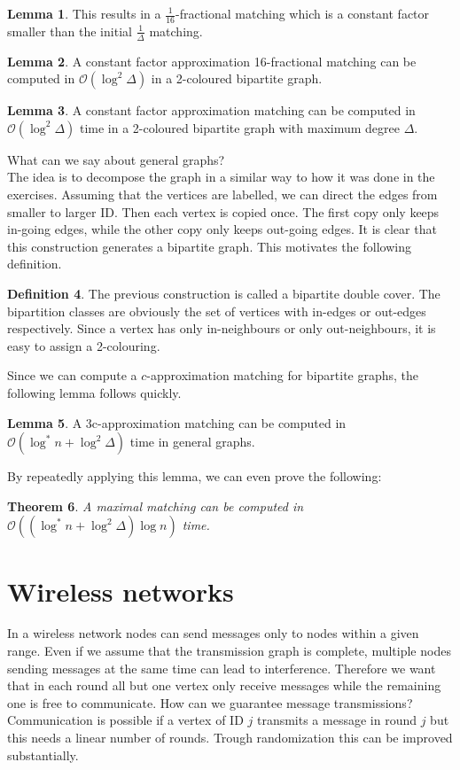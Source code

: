 \documentclass[a4paper, 12pt]{article}
\theoremstyle{plain}
\newtheorem{theorem}{Theorem}[section] %
\theoremstyle{definition}
\newtheorem{definition}[theorem]{Definition} %
\theoremstyle{lemma}
\newtheorem{lemma}[theorem]{Lemma}
\theoremstyle{remark}
\theoremstyle{corollary}
\theoremstyle{example}
\begin{document}
	\begin{lemma}
		This results in a $\frac{1}{16}$-fractional matching which is a constant factor smaller than the initial $\frac{1}{\Delta}$ matching. 
	\end{lemma}
	\begin{lemma}
		A constant factor approximation 16-fractional matching can be computed in $\mathcal{O}(\log^2 \Delta)$ in a 2-coloured bipartite graph.
	\end{lemma}
	\begin{lemma}
		A constant factor approximation matching can be computed in $\mathcal{O}(\log^2 \Delta)$ time in a 2-coloured bipartite graph with maximum degree $\Delta$.
	\end{lemma}
	What can we say about general graphs?\\
	The idea is to decompose the graph in a similar way to how it was done in the exercises. Assuming that the vertices are labelled, we can direct the edges from smaller to larger ID. Then each vertex is copied once. The first copy only keeps in-going edges, while the other copy only keeps out-going edges. It is clear that this construction generates a bipartite graph. This motivates the following definition.
	\begin{definition}
		The previous construction is called a bipartite double cover. The bipartition classes are obviously the set of vertices with in-edges or out-edges respectively. Since a vertex has only in-neighbours or only out-neighbours, it is easy to assign a 2-colouring.
	\end{definition}
	Since we can compute a $c$-approximation matching for bipartite graphs, the following lemma follows quickly.
	\begin{lemma}
		A 3c-approximation matching can be computed in $\mathcal{O}(\log^*n + \log^2\Delta)$ time in general graphs.
	\end{lemma}
	By repeatedly applying this lemma, we can even prove the following:
	\begin{theorem}
		A maximal matching can be computed in $\mathcal{O}((\log^*n + \log^2\Delta)\log n)$ time.
	\end{theorem}
	\section{Wireless networks}
	In a wireless network nodes can send messages only to nodes within a given range. Even if we assume that the transmission graph is complete, multiple nodes sending messages at the same time can lead to interference. Therefore we want that in each round all but one vertex only receive messages while the remaining one is free to communicate. How can we guarantee message transmissions? Communication is possible if a vertex of ID $j$ transmits a message in round $j$ but this needs a linear number of rounds. Trough randomization this can be improved substantially.
\end{document}
